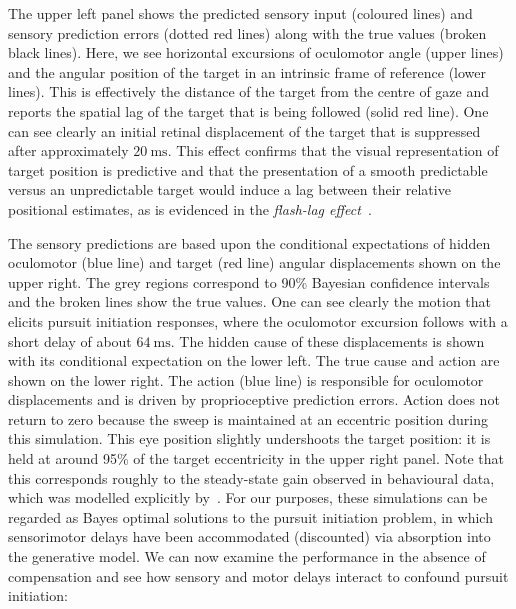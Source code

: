 \documentclass[a4paper]{article} %
\newcommand{\ms}{\si{\milli\second}}%
\begin{document}
The upper left panel shows the predicted sensory input (coloured lines)
and sensory prediction errors (dotted red lines) along with the true
values (broken black lines). Here, we see horizontal excursions of
oculomotor angle (upper lines) and the angular position of the target in
an intrinsic frame of reference (lower lines). This is effectively the
distance of the target from the centre of gaze and reports the spatial
lag of the target that is being followed (solid red line). One can see
clearly an initial retinal displacement of the target that is suppressed
after approximately $20~\ms $. This effect confirms that the visual representation of target position is predictive
and that the presentation of a smooth predictable versus an
unpredictable target would induce a lag between their relative
positional estimates, as is evidenced in the \emph{flash-lag
effect}~\citep{Nijhawan94}.

The sensory predictions are based upon the conditional expectations of
hidden oculomotor (blue line) and target (red line) angular
displacements shown on the upper right. The grey regions correspond to
90\% Bayesian confidence intervals and the broken lines show the true
values. One can see clearly the motion that elicits pursuit initiation
responses, where the oculomotor excursion follows with a short delay of
about $64~\ms$. The hidden cause of these
displacements is shown with its conditional expectation on the lower
left. The true cause and action are shown on the lower right. The action
(blue line) is responsible for oculomotor displacements and is driven by
proprioceptive prediction errors. %
Action does not return to zero because the sweep is maintained at an eccentric position during this simulation. This eye position slightly undershoots the target position: it is held at around 95\% of the target eccentricity in the upper right panel. Note that this corresponds roughly to the steady-state gain observed in behavioural data, which was modelled explicitly by~\citep{Robinson86}. %
For our purposes, these simulations can be regarded as
Bayes optimal solutions to the pursuit initiation problem, in which
sensorimotor delays have been accommodated (discounted) via absorption
into the generative model. We can now examine the performance in the
absence of compensation and see how sensory and motor delays interact to
confound pursuit initiation:
\end{document}
